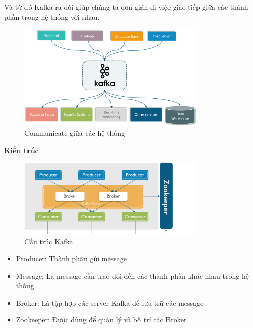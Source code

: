             Và từ đó Kafka ra đời giúp chúng ta đơn giản đi việc giao tiếp giữa các thành phần trong hệ thống với nhau.
            
             \begin{figure}[H]   			\includegraphics[width=0.8\textwidth]{Images/Kafka3.png}
    		\centering
    		\linebreak
    		\caption{Communicate giữa các hệ thống}
            \end{figure}
            
            \textbf{Kiến trúc}
            
             \begin{figure}[H]   			\includegraphics[width=0.8\textwidth]{Images/Kafka2.png}
    		\centering
    		\linebreak
    		\caption{Cấu trúc Kafka}
            \end{figure}
            
            \begin{itemize}
                \item Producer: Thành phần gửi message
                \item Message: Là message cần trao đổi đến các thành phần khác nhau trong hệ thống.
                \item Broker: Là tập hợp các server Kafka để lưu trữ các message
                \item Zookeeper: Được dùng để quản lý và bố trí các Broker
            \end{itemize}
            
